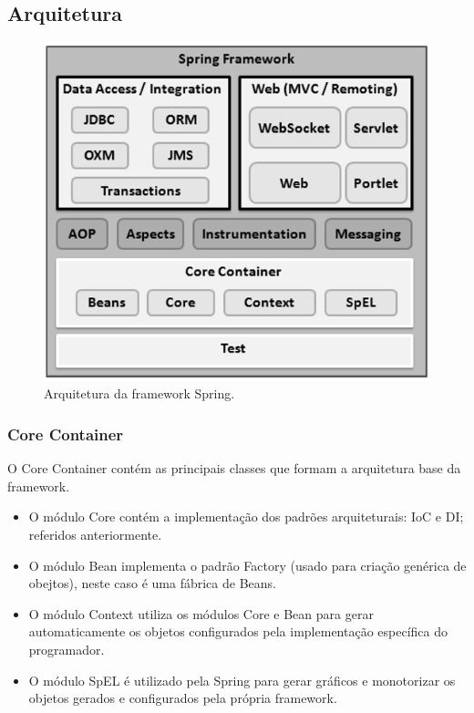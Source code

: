 \subsection{Arquitetura}

\begin{figure}[H]
    \centering
    \includegraphics[scale=0.8]{images/spring_architecture.png}
    \caption{Arquitetura da framework Spring.}
    \label{fig:grails}
\end{figure}

\subsubsection{Core Container}

\hspace{5mm} O Core Container contém as principais classes que formam a arquitetura base da framework.

\begin{itemize}
    
    \item O módulo Core contém a implementação dos padrões arquiteturais: IoC e DI; referidos anteriormente.
    
    \item O módulo Bean implementa o padrão Factory (usado para criação genérica de obejtos), neste caso é uma fábrica de Beans.
    
    \item O módulo Context utiliza os módulos Core e Bean para gerar automaticamente os objetos configurados pela implementação específica do programador. 
    
    \item O módulo SpEL é utilizado pela Spring para gerar gráficos e monotorizar os objetos gerados e configurados pela própria framework.
    
\end{itemize}

